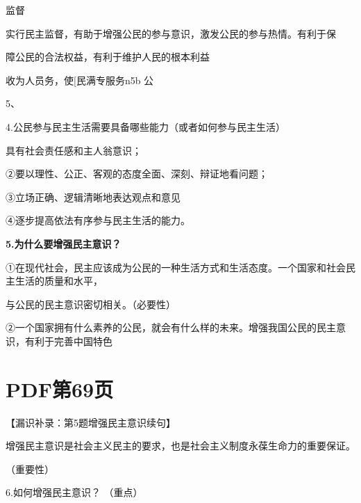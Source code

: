 \documentclass[lang=cn,11pt]{elegantbook}
\newcommand{\daofasym}[1]{{\daofasymbolfont #1}}
\newcommand{\daofasym}[1]{#1}
\begin{document}
监督\par

实行民主监督，有助于增强公民的参与意识，激发公民的参与热情。有利于保\par

障公民的合法权益，有利于维护人民的根本利益\par

收为人员务，使[民满专服务n5b 公\par

5、\par

4.公民参与民主生活需要具备哪些能力（或者如何参与民主生活）\par

具有社会责任感和主人翁意识；\par

\daofasym{②}要以理性、公正、客观的态度全面、深刻、辩证地看问题；\par

\daofasym{③}立场正确、逻辑清晰地表达观点和意见\par

\daofasym{④}逐步提高依法有序参与民主生活的能力。\par

\textbf{5.为什么要增强民主意识？}\par

\daofasym{①}在现代社会，民主应该成为公民的一种生活方式和生活态度。一个国家和社会民主生活的质量和水平，\par

与公民的民主意识密切相关。（必要性）\par

\daofasym{②}一个国家拥有什么素养的公民，就会有什么样的未来。增强我国公民的民主意识，有利于完善中国特色\par


\section*{PDF第69页}

【漏识补录：第5题增强民主意识续句】\par

增强民主意识是社会主义民主的要求，也是社会主义制度永葆生命力的重要保证。\par

（重要性）\par

6.如何增强民主意识？ （重点）\par
\end{document}
